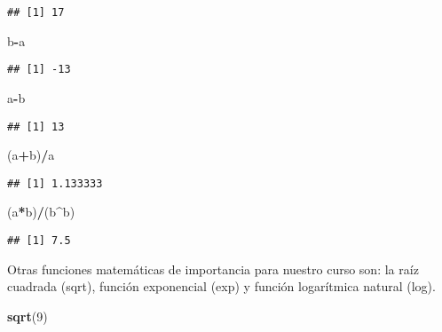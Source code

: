 \documentclass[]{book}
\newenvironment{Shaded}{\begin{snugshade}}{\end{snugshade}}
\newcommand{\DecValTok}[1]{\textcolor[rgb]{0.00,0.00,0.81}{#1}}
\newcommand{\KeywordTok}[1]{\textcolor[rgb]{0.13,0.29,0.53}{\textbf{#1}}}
\newcommand{\NormalTok}[1]{#1}
\newcommand{\OperatorTok}[1]{\textcolor[rgb]{0.81,0.36,0.00}{\textbf{#1}}}
\begin{document}
\begin{verbatim}
## [1] 17
\end{verbatim}

\begin{Shaded}
\begin{Highlighting}[]
\NormalTok{b}\OperatorTok{-}\NormalTok{a}
\end{Highlighting}
\end{Shaded}

\begin{verbatim}
## [1] -13
\end{verbatim}

\begin{Shaded}
\begin{Highlighting}[]
\NormalTok{a}\OperatorTok{-}\NormalTok{b}
\end{Highlighting}
\end{Shaded}

\begin{verbatim}
## [1] 13
\end{verbatim}

\begin{Shaded}
\begin{Highlighting}[]
\NormalTok{(a}\OperatorTok{+}\NormalTok{b)}\OperatorTok{/}\NormalTok{a}
\end{Highlighting}
\end{Shaded}

\begin{verbatim}
## [1] 1.133333
\end{verbatim}

\begin{Shaded}
\begin{Highlighting}[]
\NormalTok{(a}\OperatorTok{*}\NormalTok{b)}\OperatorTok{/}\NormalTok{(b}\OperatorTok{^}\NormalTok{b)}
\end{Highlighting}
\end{Shaded}

\begin{verbatim}
## [1] 7.5
\end{verbatim}

Otras funciones matemáticas de importancia para nuestro curso son: la raíz cuadrada (sqrt), función exponencial (exp) y función logarítmica natural (log).

\begin{Shaded}
\begin{Highlighting}[]
\KeywordTok{sqrt}\NormalTok{(}\DecValTok{9}\NormalTok{)}
\end{Highlighting}
\end{Shaded}
\end{document}
